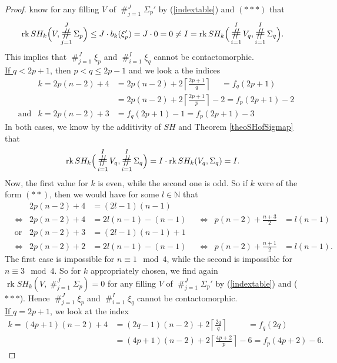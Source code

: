 \documentclass[a4paper,12pt,bibliography=totocnumbered,titlepage=false,abstracton,bookmarksnumbered=true]{scrartcl}
\DeclareMathOperator*{\consumt}{\#}
\DeclareMathOperator*{\consumd}{\text{\Large$\#$}}
\DeclareMathOperator{\rk}{rk}
\theoremstyle{definition}
\begin{document}
\begin{proof}
 know for any filling $V$ of $\consumt_{j=1}^J \Sigma_p'$ by (\ref{indextable}) and $(\ast\ast\ast)$ that
 \[\rk SH_k\Big(V,\consumd_{j=1}^J\Sigma_p\Big)\leq J\cdot b_k(\xi_p') =J\cdot 0=0\neq I =\rk SH_k\Big(\consumd_{i=1}^I V_q,\consumd_{i=1}^I \Sigma_q\Big).\]
 This implies that $ \consumt_{j=1}^J \xi_p$ and $ \consumt_{i=1}^I \xi_q$ cannot be contactomorphic.\bigskip\\
 \underline{If $q<2p{+}1$}, then $p<q\leq 2p{-}1$ and we look a the indices
 \begin{align*}
  && k=2p(n{-}2)+4&=2p(n{-}2)+2\left\lceil\frac{2p{+}1}{q}\right\rceil \phantom{-2}= f_q(2p{+}1)\\
  &&&=2p(n{-}2)+2\left\lceil\frac{2p{+}1}{p}\right\rceil {-}2=f_p(2p{+}1)-2\\
  &\text{and}& k=2p(n{-}2)+3&=f_q(2p{+}1)-1=f_p(2p{+}1)-3
 \end{align*}
In both cases, we know by the additivity of $SH$ and Theorem \ref{theoSHofSigmap} that
 \[\rk SH_k\Big(\consumd_{i=1}^I V_q,\consumd_{i=1}^I \Sigma_q\Big)=I\cdot \rk SH_k(V_q,\Sigma_q) = I.\]
 Now, the first value for $k$ is even, while the second one is odd. So if $k$ were of the form $(\ast\ast)$, then we would have for some $l\in\mathbb{N}$ that
 \begin{align*}
  &&2p(n{-}2)+4&=(2l{-}1)(n{-}1) \\
  &\Leftrightarrow& 2p(n{-}2)+4 &= 2l(n{-}1)-(n{-}1) &&\Leftrightarrow& p(n{-}2)+\frac{n{+}3}{2}&=l(n{-}1)\\
  &\text{or}&2p(n{-}2)+3&=(2l{-}1)(n{-}1)+1 \\
  &\Leftrightarrow& 2p(n{-}2)+2&=2l(n{-}1)-(n{-}1) &&\Leftrightarrow& p(n{-}2)+\frac{n{+}1}{2} &=l(n{-}1).
 \end{align*}
 The first case is impossible for $n\equiv 1\mod 4$, while the second is impossible for $n\equiv 3\mod 4$. So for $k$ appropriately chosen, we find again $\rk SH_k\left(V,\consumt_{j=1}^J\Sigma_p\right)=0$ for any filling $V$ of $\consumt_{j=1}^J \Sigma_p'$ by (\ref{indextable}) and ($\ast\ast\ast$). Hence $\consumt_{j=1}^J \xi_p$ and $\consumt_{i=1}^I \xi_q$ cannot be contactomorphic.\bigskip\\
 \underline{If $q=2p{+}1$}, we look at the index
 \begin{align*}
  k=(4p{+}1)(n{-}2)+4&=(2q{-}1)(n{-}2)+2\left\lceil\frac{2q}{q}\right\rceil\phantom{+-6}=f_q(2q)\\
  &=(4p{+}1)(n{-}2)+2\left\lceil\frac{4p{+}2}{p}\right\rceil{-}6=f_p(4p{+}2)-6.
 \end{align*}

\end{proof}
\end{document}

